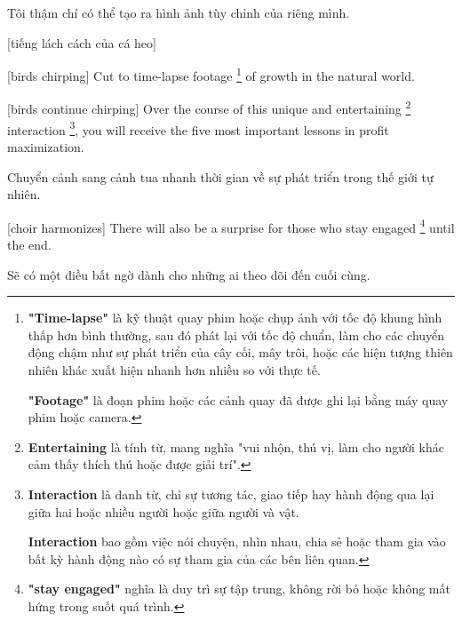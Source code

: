 \documentclass[a4paper]{article}
\begin{document}
	\begin{vietnamese-v2}
		
		Tôi thậm chí có thể tạo ra hình ảnh tùy chỉnh của riêng mình.
		
		[tiếng lách cách của cá heo]
	\end{vietnamese-v2}
	
	[birds chirping]
	Cut to time-lapse footage  \footnote{
		\textbf{"Time-lapse"} là kỹ thuật quay phim hoặc chụp ảnh với tốc độ khung hình thấp hơn bình thường, sau đó phát lại với tốc độ chuẩn, làm cho các chuyển động chậm như sự phát triển của cây cối, mây trôi, hoặc các hiện tượng thiên nhiên khác xuất hiện nhanh hơn nhiều so với thực tế.
		
		\textbf{"Footage"} là đoạn phim hoặc các cảnh quay đã được ghi lại bằng máy quay phim hoặc camera.
	
	} of growth in the natural world.
	
	
	[birds continue chirping]
	Over the course of this unique and entertaining \footnote{
	 	\textbf{Entertaining} là tính từ, mang nghĩa "vui nhộn, thú vị, làm cho người khác cảm thấy thích thú hoặc được giải trí".
	 	
	} interaction \footnote{
		\textbf{Interaction} là danh từ, chỉ sự tương tác, giao tiếp hay hành động qua lại giữa hai hoặc nhiều người hoặc giữa người và vật.
		
		\textbf{Interaction} bao gồm việc nói chuyện, nhìn nhau, chia sẻ hoặc tham gia vào bất kỳ hành động nào có sự tham gia của các bên liên quan.
	
	}, you will receive the five most important lessons in profit maximization.
	
	\begin{vietnamese-v2}
		
		Chuyển cảnh sang cảnh tua nhanh thời gian về sự phát triển trong thế giới tự nhiên.
	\end{vietnamese-v2}
	
	
	[choir harmonizes]
	There will also be a surprise for those who stay engaged \footnote{
		\textbf{"stay engaged"} nghĩa là duy trì sự tập trung, không rời bỏ hoặc không mất hứng trong suốt quá trình.
	
	} until the end.
	
	\begin{vietnamese-v2}
		
		Sẽ có một điều bất ngờ dành cho những ai theo dõi đến cuối cùng.
	\end{vietnamese-v2}
	
\end{document}
